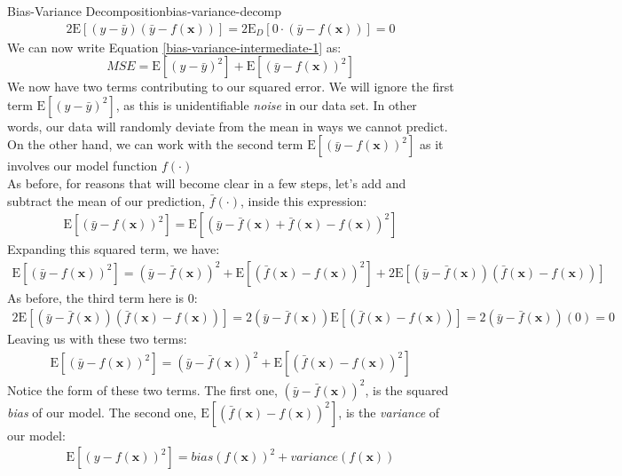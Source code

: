 \begin{derivation}{Bias-Variance Decomposition}{bias-variance-decomp}
\begin{align*}
        2\mathrm{E}[(y - \bar{y})(\bar{y} - f(\textbf{x}))] = 2\mathrm{E}_{D}[0 \cdot (\bar{y} - f(\textbf{x}))] = 0
    \end{align*}
    We can now write Equation \ref{bias-variance-intermediate-1} as:
    \begin{equation} \label{bias-variance-intermediate-2}
        \textit{MSE} = \mathrm{E}[(y - \bar{y})^{2}] + \mathrm{E}[(\bar{y} - f(\textbf{x}))^{2}]
    \end{equation}
    We now have two terms contributing to our squared error. We will ignore the first term $\mathrm{E}[(y - \bar{y})^{2}]$, as this is unidentifiable \textit{noise} in our data set. In other words, our data will randomly deviate from the mean in ways we cannot predict. On the other hand, we can work with the second term $\mathrm{E}[(\bar{y} - f(\textbf{x}))^{2}]$ as it involves our model function $f(\cdot)$ \\

    As before, for reasons that will become clear in a few steps, let's add and subtract the mean of our prediction, $\bar{f}(\cdot)$, inside this expression:
    \begin{align*}
        \mathrm{E}[(\bar{y} - f(\textbf{x}))^{2}] = \mathrm{E}[(\bar{y} - \bar{f}(\textbf{x}) + \bar{f}(\textbf{x}) - f(\textbf{x}))^{2}]
    \end{align*}
    Expanding this squared term, we have:
    \begin{align*}
        \mathrm{E}[(\bar{y} - f(\textbf{x}))^{2}] = (\bar{y} - \bar{f}(\textbf{x}))^{2} + \mathrm{E}[(\bar{f}(\textbf{x}) - f(\textbf{x}))^{2}] + 2\mathrm{E}[(\bar{y} - \bar{f}(\textbf{x}))(\bar{f}(\textbf{x}) - f(\textbf{x}))]
    \end{align*}
    As before, the third term here is 0:
    \begin{align*}
        2\mathrm{E}[(\bar{y} - \bar{f}(\textbf{x}))(\bar{f}(\textbf{x}) - f(\textbf{x}))] = 2(\bar{y} - \bar{f}(\textbf{x}))\mathrm{E}[(\bar{f}(\textbf{x}) - f(\textbf{x}))] = 2(\bar{y} - \bar{f}(\textbf{x}))(0) = 0
    \end{align*}
    Leaving us with these two terms:
    \begin{align*}
        \mathrm{E}[(\bar{y} - f(\textbf{x}))^{2}] = (\bar{y} - \bar{f}(\textbf{x}))^{2} + \mathrm{E}[(\bar{f}(\textbf{x}) - f(\textbf{x}))^{2}]
    \end{align*}
    Notice the form of these two terms. The first one, $(\bar{y} - \bar{f}(\textbf{x}))^{2}$, is the squared \textit{bias} of our model. The second one, $\mathrm{E}[(\bar{f}(\textbf{x}) - f(\textbf{x}))^{2}]$, is the \textit{variance} of our model:
    \begin{align*}
        \mathrm{E}[(y - f(\textbf{x}))^{2}] = \textit{bias}(f(\textbf{x}))^{2} + \textit{variance}(f(\textbf{x}))
    \end{align*}


\end{derivation}

